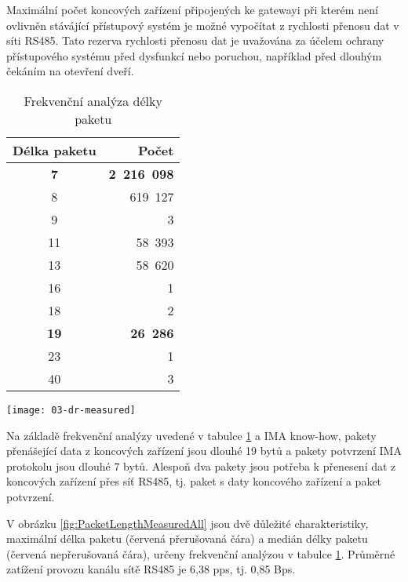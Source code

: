 Maximální počet koncových zařízení připojených ke gatewayi při kterém není ovlivněn stávájící přístupový systém je možné vypočítat z rychlosti přenosu dat v síti RS485. 
Tato rezerva rychlosti přenosu dat je uvažována za účelem ochrany přístupového systému před dysfunkcí nebo poruchou, například před dlouhým čekáním na otevření dveří.

\begin{longtable} {|c|r|}
\caption{Frekvenční analýza délky paketu} 
\label{tab:FreqAnalysis} \\
            \hline
    Délka paketu &  Počet \\ \hline
    \textbf{7}  &  \textbf{2~216~098}  \\
    8  &   619~127   \\
    9  &         3   \\
    11 &    58~393   \\
    13 &    58~620   \\
    16 &         1   \\
    18 &         2   \\
    \textbf{19} &    \textbf{26~286}   \\
    23 &         1   \\
    40 &         3   \\
    \hline
\end{longtable}

\begin{figure*}[ht]
    \centering
    \texttt{[image: 03-dr-measured]}
    \caption{Měřená rychlost přenosu dat [bps] v síti RS485 během doby testování}
    \label{fig:PacketLengthMeasuredAll}
\end{figure*}

Na základě frekvenční analýzy uvedené v tabulce \ref{tab:FreqAnalysis} a IMA know-how, pakety přenášející data z koncových zařízení jsou dlouhé 19 bytů a pakety potvrzení IMA protokolu jsou dlouhé 7 bytů. Alespoň dva pakety jsou potřeba k přenesení dat z koncových zařízení přes síť RS485, tj. paket s daty koncového zařízení a paket potvrzení.

V obrázku \ref{fig:PacketLengthMeasuredAll} jsou dvě důležité charakteristiky, maximální délka paketu 
(červená přerušovaná čára) a medián délky paketu (červená nepřerušovaná čára), určeny frekvenční analýzou v tabulce \ref{tab:FreqAnalysis}. 
Průměrné zatížení provozu kanálu sítě RS485 je 6,38 pps, tj. 0,85 Bps.


